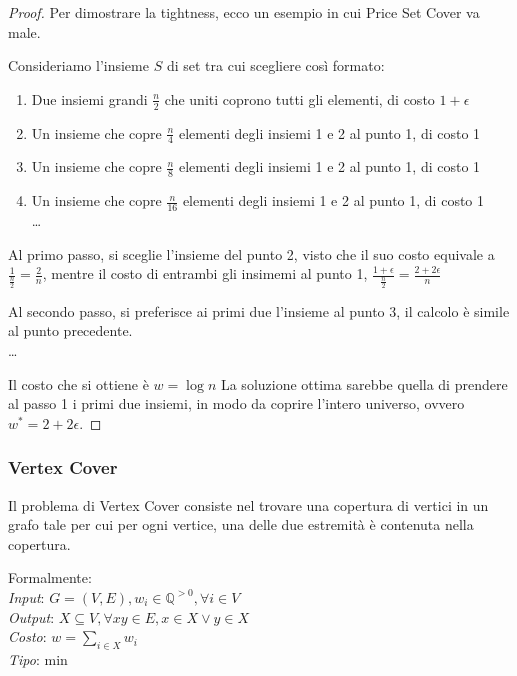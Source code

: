 \begin{proof}
    Per dimostrare la tightness, ecco un esempio in cui Price Set Cover va male.

    Consideriamo l'insieme $S$ di set tra cui scegliere così formato:
    \begin{enumerate}
        \item Due insiemi grandi $\frac{n}{2}$ che uniti coprono tutti gli elementi, 
        di costo $1+\epsilon$
        \item Un insieme che copre $\frac{n}{4}$ elementi degli insiemi 1 e 2 al punto 1, di costo 1
        \item Un insieme che copre $\frac{n}{8}$ elementi degli insiemi 1 e 2 al punto 1, di costo 1
        \item Un insieme che copre $\frac{n}{16}$ elementi degli insiemi 1 e 2 al punto 1, di costo 1\\
        \dots
    \end{enumerate}
    Al primo passo, si sceglie l'insieme del punto 2, visto che
    il suo costo equivale a $\frac{1}{\frac{n}{2}} = \frac{2}{n}$, mentre il costo 
    di entrambi gli insimemi al punto 1, $\frac{1+\epsilon}{\frac{n}{2}} = \frac{2+2\epsilon}{n}$

    Al secondo passo, si preferisce ai primi due l'insieme al punto 3, il calcolo è simile al punto precedente.\\
    \dots

    Il costo che si ottiene è $w = \log n$
    La soluzione ottima sarebbe quella di prendere al passo 1 i primi due insiemi, in modo da coprire l'intero 
    universo, ovvero $w^* = 2 + 2\epsilon$.
\end{proof}

\subsubsection{Vertex Cover}
Il problema di Vertex Cover consiste nel trovare una copertura di 
vertici in un grafo tale per cui per ogni vertice, una delle due estremità è contenuta nella copertura.

Formalmente: \\
\emph{Input}: $G=(V,E), w_i \in \mathbb{Q}^{>0}, \forall i \in V$\\
\emph{Output}: $X \subseteq V, \forall xy \in E, x \in X \vee y \in X$\\
\emph{Costo}: $w = \sum_{i \in X} w_i$\\
\emph{Tipo}: min\\

